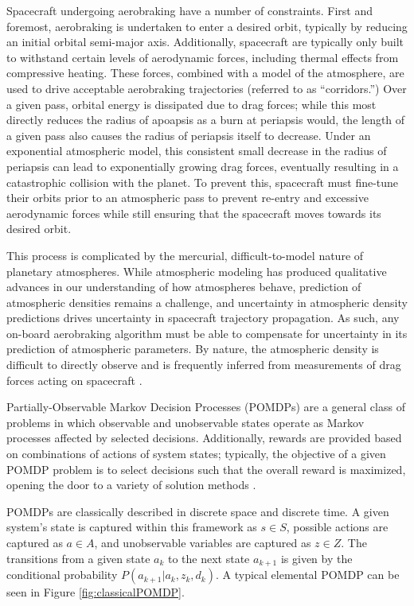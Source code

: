 \documentclass[paper,11pt]{AAS}		%
\begin{document}
Spacecraft undergoing aerobraking have a number of constraints. First and foremost, aerobraking is undertaken to enter a 
desired orbit, typically by reducing an initial orbital semi-major axis. Additionally, spacecraft are typically only built to 
withstand certain levels of aerodynamic forces, including thermal effects from compressive heating. These forces, combined with 
a model of the atmosphere, are used to drive acceptable aerobraking trajectories (referred to as ``corridors.'') Over a given 
pass, orbital energy is dissipated due to drag forces; while this most directly reduces the radius of apoapsis as a burn at 
periapsis would, the length of a given pass also causes the radius of periapsis itself to decrease. Under an exponential 
atmospheric model, this consistent small decrease in the radius of periapsis can lead to  exponentially growing drag forces, 
eventually resulting in a catastrophic collision with the planet. To prevent this, spacecraft must fine-tune their orbits prior 
to 
an atmospheric pass to prevent re-entry and excessive aerodynamic forces while still ensuring that the spacecraft moves towards 
its desired orbit.

This process is complicated by the mercurial, difficult-to-model nature of planetary atmospheres. While atmospheric modeling 
has produced qualitative advances in our understanding of how atmospheres behave, prediction of atmospheric densities remains a 
challenge, and uncertainty in atmospheric density predictions drives uncertainty in spacecraft trajectory propagation. As such, 
any on-board aerobraking algorithm must be able to compensate for uncertainty in its prediction of atmospheric parameters. 
By nature, the atmospheric density is difficult to directly observe and is frequently inferred from measurements of drag forces 
acting on spacecraft \cite{Sutton2008}. 

Partially-Observable Markov Decision Processes (POMDPs) are a general class of problems in which observable and unobservable 
states operate as Markov processes affected by selected decisions. Additionally, rewards are provided based on combinations of 
actions of system states; typically, the objective of a given POMDP problem is to select decisions such that the overall reward 
is maximized, opening the door to a variety of solution methods \cite{Sutton2012}. 

POMDPs are classically described in discrete space and discrete time. A given system's state is captured within this framework 
as $s \in S$, possible actions are captured as $a \in A$, and unobservable variables are captured as $z \in Z$. The transitions 
from a given state $a_k$ to the next state $a_{k+1}$ is given by the conditional probability $P(a_{k+1}|a_k, z_k, d_k)$. A 
typical elemental POMDP can be seen in Figure \ref{fig:classicalPOMDP}. 
\end{document}
